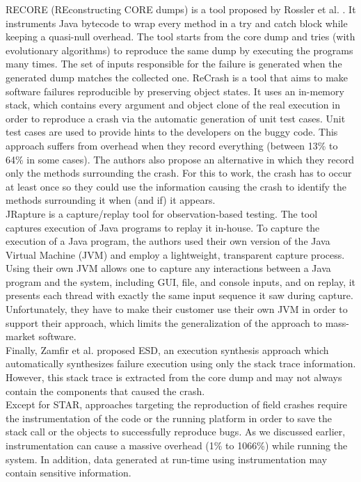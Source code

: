 \documentclass[times]{smrauth}
\begin{document}
RECORE (REconstructing CORE dumps) is a tool proposed by Rossler et al. \cite{Rossler2013}.
It instruments Java bytecode to wrap every method in a try and catch block while keeping a quasi-null overhead. 
The tool starts from the core dump and tries (with evolutionary algorithms) to reproduce the same dump by executing the programs many times. 
The set of inputs responsible for the failure is generated when the generated dump matches the collected one.
ReCrash \cite{Artzi2008} is a tool that aims to make software failures reproducible by preserving object states. 
It uses an in-memory stack, which contains every argument and object clone of the real execution in order to reproduce a crash via the automatic generation of unit test cases. 
Unit test cases are used to provide hints to the developers on the buggy code. This approach suffers from overhead when they record everything (between 13\% to 64\% in some cases). 
The authors also propose an alternative in which they record only the methods surrounding the crash.
For this to work, the crash has to occur at least once so they could use the information causing the crash to identify the methods surrounding it when (and if) it appears. \\

JRapture \cite{Steven2000} is a capture/replay tool for observation-based testing. 
The tool captures execution of Java programs to replay it in-house.  To capture the execution of a Java program, the authors used their own version of the Java Virtual Machine (JVM) and employ a lightweight, transparent capture process. Using their own JVM allows one to capture any interactions between a Java program and the system, including GUI, file, and console inputs, and on replay, it presents each thread with exactly the same input sequence it saw during capture. 
Unfortunately, they have to make their customer use their own JVM in order to support their approach, which limits the generalization of the approach to mass-market software.\\

Finally, Zamfir et al. \cite{Parnin2011} proposed ESD, an execution synthesis approach which automatically synthesizes failure execution using only the stack trace information. However, this stack trace is extracted from the core dump and may not always contain the components that caused the crash.\\

Except for STAR, approaches targeting the reproduction of field crashes require the instrumentation of the code or the running platform in order to save the stack call or the objects to successfully reproduce bugs. As we discussed earlier, instrumentation can cause a massive overhead (1\% to 1066\%) while running the system. In addition, data generated at run-time using instrumentation may contain sensitive information.
\end{document}
